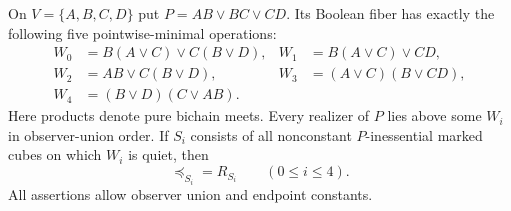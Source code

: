 \begin{theorem}
\label{core:thm:path-minimal-realizers}
On $V=\{A,B,C,D\}$ put $P=AB\vee BC\vee CD$. Its Boolean fiber has
exactly the following five pointwise-minimal operations:
\[
\begin{aligned}
 W_0&=B(A\vee C)\vee C(B\vee D),&
 W_1&=B(A\vee C)\vee CD,\\
 W_2&=AB\vee C(B\vee D),&
 W_3&=(A\vee C)(B\vee CD),\\
 W_4&=(B\vee D)(C\vee AB).
\end{aligned}
\]
Here products denote pure bichain meets. Every realizer of $P$ lies
above some $W_i$ in observer-union order. If $S_i$ consists of all
nonconstant $P$-inessential marked cubes on which $W_i$ is quiet, then
\[
 \preceq_{S_i}=R_{S_i}\qquad(0\leq i\leq4).
\]
All assertions allow observer union and endpoint constants.
\end{theorem}

